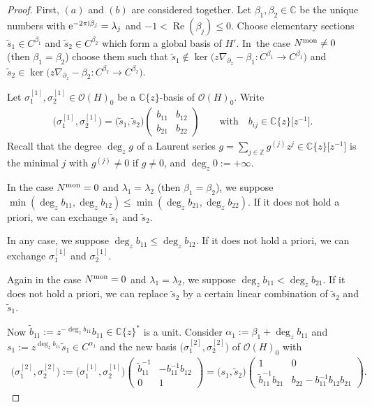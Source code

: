 \documentclass[pdftex]{sigma}%
\numberwithin{equation}{section}
\numberwithin{figure}{section}
\newcommand{\Z}{{\mathbb Z}}
\newcommand{\C}{{\mathbb C}}
\newcommand{\OO}{{\mathcal O}}
\newcommand{\www}{\widetilde}
\newcommand{\paa}{\partial}
\newcommand{\nnn}{\nabla}
\DeclareMathOperator{\Ree}{Re}
\begin{document}
\begin{proof} First, $(a)$ and $(b)$ are considered together.
Let $\beta_1,\beta_2\in\C$ be the unique numbers
with ${\rm e}^{-2\pi {\rm i}\beta_j}=\lambda_j$ and
$-1<\Ree(\beta_j)\leq 0$. Choose elementary sections
$\www s_1\in C^{\beta_1}$ and
$\www s_2\in C^{\beta_2}$ which
form a global basis of $H'$. In~the case $N^{\rm mon}\neq 0$ (then $\beta_1=\beta_2$)
choose them such that
$\www s_1\notin \ker\big(z\nnn_{\paa_z}-\beta_1\colon C^{\beta_1}\to
C^{\beta_1}\big)$ and~$\www s_2\in\ker\big(z\nnn_{\paa_z}-\beta_2\colon
C^{\beta_2}\to C^{\beta_2}\big)$.

Let $\sigma_1^{[1]},\sigma_2^{[1]}\in\OO(H)_0$
be a $\C\{z\}$-basis of $\OO(H)_0$. Write
\begin{gather*}%
\big(\sigma_1^{[1]},\sigma_2^{[1]}\big)=\big(\www s_1,\www s_2\big)
\begin{pmatrix}
b_{11}& b_{12}\\b_{21}&b_{22}\end{pmatrix}
\qquad\text{with}\quad
b_{ij}\in\C\{z\}\big[z^{-1}\big].
\end{gather*}
Recall that the degree $\deg_z g$ of a Laurent series
$g=\sum_{j\in\Z}g^{(j)}z^j\in\C\{z\}\big[z^{-1}\big]$ is the
minimal $j$ with $g^{(j)}\neq 0$ if $g\neq 0$,
and $\deg_z0:=+\infty$.

In the case $N^{\rm mon}=0$ and $\lambda_1=\lambda_2$
(then $\beta_1=\beta_2$),
we suppose $\min(\deg_z b_{11},\deg_z b_{12})
\leq \min(\deg_z b_{21},\deg_z b_{22})$.
If it does not hold a priori, we can exchange
$\www s_1$ and $\www s_2$.

In any case, we suppose $\deg_z b_{11}\leq \deg_z b_{12}$.
If it does not hold a priori, we can exchange $\sigma_1^{[1]}$
and $\sigma_2^{[1]}$.

Again in the case $N^{\rm mon}=0$ and $\lambda_1=\lambda_2$,
we suppose $\deg_zb_{11}<\deg_zb_{21}$. If it does not hold
a priori, we can replace $\www s_2$ by a certain linear
combination of $\www s_2$ and $\www s_1$.

Now $\www b_{11}:=z^{-\deg_z b_{11}}b_{11}\in\C\{z\}^*$ is
a unit. Consider $\alpha_1:=\beta_1+\deg_z b_{11}$
and $s_1:=z^{\deg_z b_{11}}\www s_1\allowbreak\in C^{\alpha_1}$
and the new basis $\big(\sigma_1^{[2]},\sigma_2^{[2]}\big)$
of $\OO(H)_0$ with
\begin{gather*}
\big(\sigma_1^{[2]},\sigma_2^{[2]}\big)
:=\big(\sigma_1^{[1]},\sigma_2^{[1]}\big)
\begin{pmatrix} \www b_{11}^{-1} &-b_{11}^{-1}b_{12} \\
0 & 1 \end{pmatrix}
= \big(s_1,\www s_2\big)
\begin{pmatrix} 1 & 0 \\ \www b_{11}^{-1} b_{21} &
b_{22}-b_{11}^{-1}b_{12}b_{21}\end{pmatrix}\!.%
\end{gather*}


\end{proof}
\end{document}
